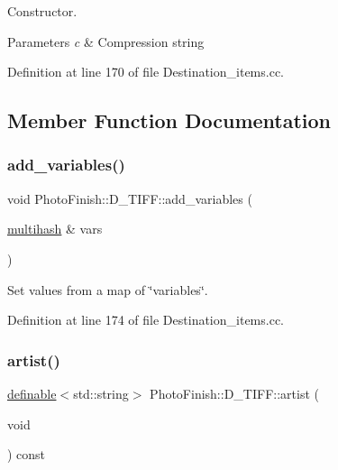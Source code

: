Constructor. 


\begin{DoxyParams}{Parameters}
{\em c} & Compression string \\
\hline
\end{DoxyParams}


Definition at line 170 of file Destination\+\_\+items.\+cc.



\subsection{Member Function Documentation}
\mbox{\label{class_photo_finish_1_1_d___t_i_f_f_af3532152cdad7861ec932185255d5756}} 
\subsubsection{\texorpdfstring{add\+\_\+variables()}{add\_variables()}}
{\footnotesize\ttfamily void Photo\+Finish\+::\+D\+\_\+\+T\+I\+F\+F\+::add\+\_\+variables (\begin{DoxyParamCaption}\item[{\hyperlink{namespace_photo_finish_a6f41796f162687538b7da5c7a95e2d18}{multihash} \&}]{vars }\end{DoxyParamCaption})}



Set values from a map of \char`\"{}variables\char`\"{}. 



Definition at line 174 of file Destination\+\_\+items.\+cc.

\mbox{\label{class_photo_finish_1_1_d___t_i_f_f_a9b9d16bc60b26b183df0466b43d68856}} 
\subsubsection{\texorpdfstring{artist()}{artist()}}
{\footnotesize\ttfamily \hyperlink{class_photo_finish_1_1definable}{definable}$<$std\+::string$>$ Photo\+Finish\+::\+D\+\_\+\+T\+I\+F\+F\+::artist (\begin{DoxyParamCaption}\item[{void}]{ }\end{DoxyParamCaption}) const\hspace{0.3cm}{\ttfamily [inline]}}



